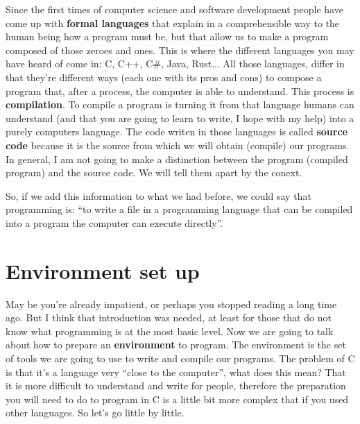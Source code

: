 \documentclass[a4paper]{article}
\begin{document}
Since the first times of computer science and software development people have
come up with \textbf{formal languages} that explain in a comprehensible way to
the human being how a program must be, but that allow us to make a program
composed of those zeroes and ones. This is where the different languages you may
have heard of come in: C, C++, C\#, Java, Rust...
All those languages, differ in that they're different ways (each one with its
pros and cons) to compose a program that, after a process, the computer is able
to understand. This process is \textbf{compilation}. To compile a program is
turning it from that language humans can understand (and that you are going to
learn to write, I hope with my help) into a purely computers language. The code
writen in those languages is called \textbf{source code} because it is the
source from which we will obtain (compile) our programs. In general, I am not
going to make a distinction between the program (compiled program) and the
source code. We will tell them apart by the conext.

So, if we add this information to what we had before, we could say that
programming is: ``to write a file in a programming language that can be
compiled into a program the computer can execute directly''.

\section{Environment set up}


May be you're already impatient, or perhaps you stopped reading a long time
ago. But I think that introduction was needed, at least for those that do not
know what programming is at the most basic level. Now we are going to talk about
how to prepare an \textbf{environment} to program. The environment is the set of
tools we are going to use to write and compile our programs.
The problem of C is that it's a language very ``close to the computer'', what
does this mean? That it is more difficult to understand and write for people,
therefore the preparation you will need to do to program in C is a little bit
more complex that if you used other languages. So let's go little by little.
\end{document}
